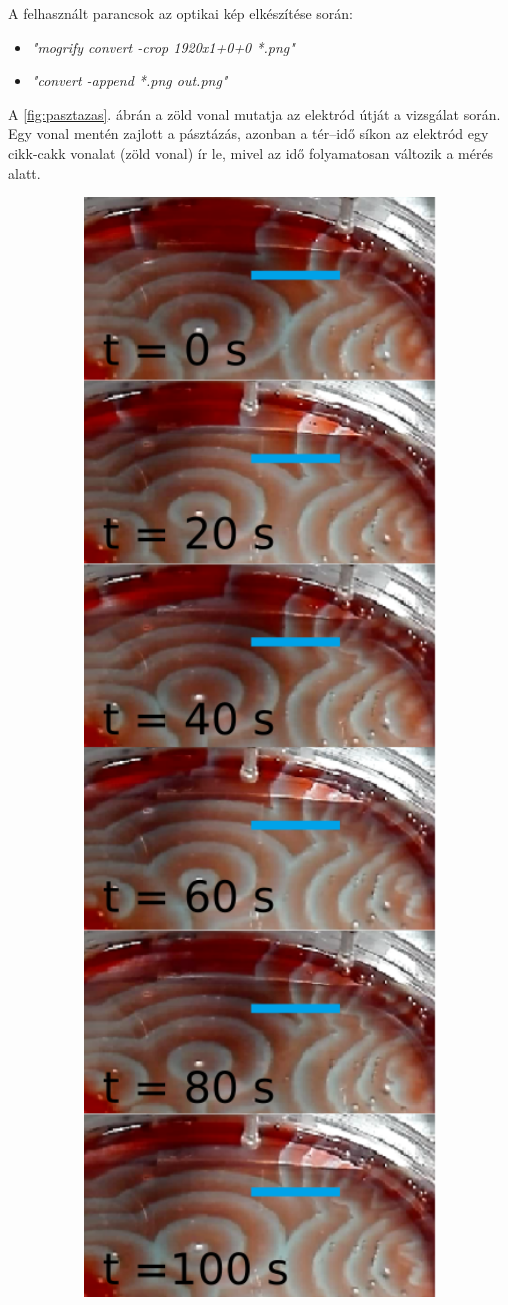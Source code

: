 A felhasznált parancsok az optikai kép elkészítése során:
\begin{itemize}
\item \emph{"mogrify convert -crop 1920x1+0+0 *.png"}
\item \emph{"convert -append *.png out.png"}
\end{itemize}
 A \ref{fig:pasztazas}. ábrán a zöld vonal mutatja az elektród útját a vizsgálat során. Egy vonal mentén zajlott a pásztázás, azonban a tér--idő síkon az elektród egy cikk-cakk vonalat (zöld vonal) ír le, mivel az idő folyamatosan változik a mérés alatt.
\begin{figure}[h!]
\centering
\includegraphics[width=1\textwidth]{img/pasztazas.png}

\end{figure}
